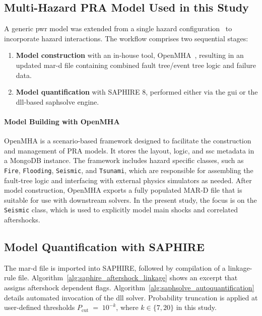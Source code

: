 \subsection{Multi-Hazard PRA Model Used in this Study}
\label{subsec:multiHazardModelUsed}

A generic \acrshort{pwr} model was extended from a single hazard configuration~\cite{Smith2021Generic} to incorporate hazard interactions.  The workflow comprises two sequential stages:

\begin{enumerate}
  \item \textbf{Model construction} with an in-house tool, OpenMHA~\cite{Batikh2024OpenMHA}, resulting in an updated \acrshort{mar-d} file containing combined fault tree/event tree logic and failure data.
  \item \textbf{Model quantification} with SAPHIRE 8, performed either via the \acrshort{gui} or the \acrshort{dll}-based \acrshort{saphsolve} engine.
\end{enumerate}

\paragraph{Model Building with OpenMHA}
OpenMHA is a scenario-based framework designed to facilitate the construction and management of PRA models. It stores the layout, logic, and \acrshort{ssc} metadata in a MongoDB instance. The framework includes hazard specific classes, such as \texttt{Fire}, \texttt{Flooding}, \texttt{Seismic}, and \texttt{Tsunami}, which are responsible for assembling the fault-tree logic and interfacing with external physics simulators as needed. After model construction, OpenMHA exports a fully populated MAR-D file that is suitable for use with downstream solvers. In the present study, the focus is on the \texttt{Seismic} class, which is used to explicitly model main shocks and correlated aftershocks.

\subsection{Model Quantification with SAPHIRE}
\label{sec:saphire_quant}
The \acrshort{mar-d} file is imported into SAPHIRE, followed by compilation of a linkage-rule file. Algorithm~\ref{alg:saphire_aftershock_linkage} shows an excerpt that assigns aftershock dependent flags. Algorithm~\ref{alg:saphsolve_autoquantification} details automated invocation of the \acrshort{dll} solver. Probability truncation is applied at user-defined thresholds $P_{\text{cut}} \;=\;10^{-k}$, where $k\in\{7,20\}$ in this study.

